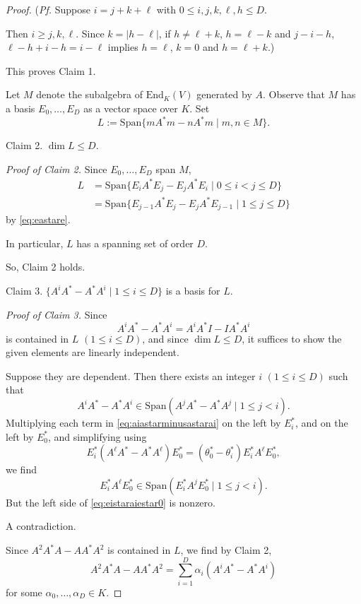 \documentclass[
]{book}
\theoremstyle{definition}
\theoremstyle{definition}
\theoremstyle{definition}
\theoremstyle{definition}
\theoremstyle{remark}
\begin{document}
\begin{proof}
(\emph{Pf.} Suppose \(i=j+k+\ell\) with \(0\leq i, j, k,\ell, h\leq D\).

Then \(i \geq j, k, \ell\). Since \(k = |h-\ell|\), if \(h\neq \ell+k\), \(h = \ell-k\) and \(j - i-h\),
\(\ell-h+i-h = i-\ell\) implies \(h=\ell\), \(k = 0\) and \(h = \ell + k\).)

This proves Claim 1.

Let \(M\) denote the subalgebra of \(\mathrm{End}_K(V)\) generated by \(A\). Observe that \(M\) has a basis \(E_0, \ldots, E_D\) as a vector space over \(K\). Set
\[L:= \mathrm{Span}\{mA^*m-nA^*m \mid m, n\in M\}.\]

Claim 2. \(\dim L \leq D\).

\emph{Proof of Claim 2.}
Since \(E_0, \ldots, E_D\) span \(M\),
\begin{align}
L & = \mathrm{Span}\{E_iA^*E_j - E_jA^*E_i \mid 0\leq i < j \leq D\}\\
& = \mathrm{Span}\{E_{j-1}A^*E_j - E_jA^*E_{j-1} \mid 1\leq j \leq D\}
\end{align}
by \eqref{eq:eastare}.

In particular, \(L\) has a spanning set of order \(D\).

So, Claim 2 holds.

Claim 3. \(\{A^iA^* - A^*A^i\mid 1\leq i\leq D\}\) is a basis for \(L\).

\emph{Proof of Claim 3.}
Since
\[A^iA^*-A^*A^i = A^iA^*I - IA^*A^i\]
is contained in \(L\) \((1\leq i\leq D)\), and since \(\dim L \leq D\), it suffices to show the given elements are linearly independent.

Suppose they are dependent. Then there exists an integer \(i\) \((1\leq i\leq D)\) such that
\begin{equation}
A^iA^*-A^*A^i \in \mathrm{Span}(A^jA^*-A^*A^j\mid 1\leq j < i). \label{eq:aiastarminusastarai}
\end{equation}
Multiplying each term in \eqref{eq:aiastarminusastarai} on the left by \(E^*_i\), and on the left by \(E^*_0\), and simplifying using
\[E^*_i(A^\ell A^*-A^*A^\ell)E^*_0 = (\theta^*_0-\theta^*_i)E^*_iA^\ell E^*_0,\]
we find
\begin{equation}
E^*_iA^\ell E^*_0 \in \mathrm{Span}(E^*_iA^jE^*_0\mid 1\leq j < i). \label{eq:eistaraiestar0}
\end{equation}
But the left side of \eqref{eq:eistaraiestar0} is nonzero.

A contradiction.

Since \(A^2A^*A-AA^*A^2\) is contained in \(L\), we find by Claim 2,
\begin{equation}
A^2A^*A - AA^*A^2 = \sum_{i=1}^D\alpha_i(A^iA^*-A^*A^i) \label{eq:a2astara}
\end{equation}
for some \(\alpha_0, \ldots, \alpha_D\in K\).


\end{proof}
\end{document}
